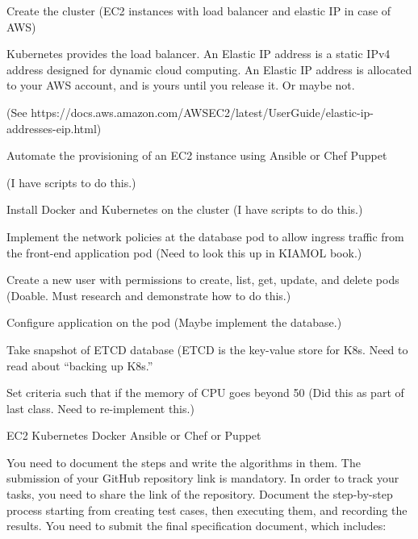 \myiteminit

\myitem Create the cluster (EC2 instances with load balancer and elastic IP in case of AWS)

Kubernetes provides the load balancer. An Elastic IP address is a static IPv4 address designed
for dynamic cloud computing. An Elastic IP address is allocated to your AWS account, and is yours until you release it.
Or maybe not.  

\noindent (See https://docs.aws.amazon.com/AWSEC2/latest/UserGuide/elastic-ip-addresses-eip.html)


\ms
\myitem Automate the provisioning of an EC2 instance using Ansible or Chef Puppet

(I have scripts to do this.)
\ms

\myitem Install Docker and Kubernetes on the cluster
(I have scripts to do this.)
\ms

\myitem Implement the network policies at the database pod to allow ingress traffic from the front-end application pod
(Need to look this up in KIAMOL book.)
\ms

\myitem Create a new user with permissions to create, list, get, update, and delete pods
(Doable.  Must research and demonstrate how to do this.)
\ms

\myitem Configure application on the pod
(Maybe implement the database.)
\ms

\myitem Take snapshot of ETCD database
(ETCD is the key-value store for K8s.  Need to read about ``backing up K8s.''
\ms

\myitem Set criteria such that if the memory of CPU goes beyond 50%
(Did this as part of last class.  Need to re-implement this.)

\bs


\ms

\myiteminit

\myitem EC2
\myitem    Kubernetes
\myitem    Docker
\myitem     Ansible or Chef or Puppet

\bs


\ms

\myiteminit

\myitem    You need to document the steps and write the algorithms in them.
\myitem    The submission of your GitHub repository link is mandatory. In order to track your tasks, you need to share the link of the repository.
\myitem Document the step-by-step process starting from creating test cases, then executing them, and recording the results.
\myitem     You need to submit the final specification document, which includes:

